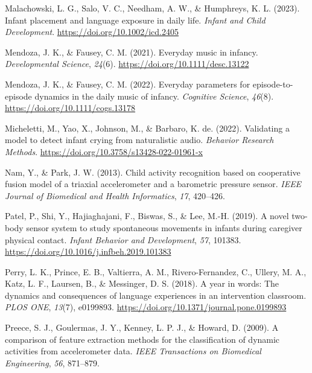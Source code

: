 \documentclass[
  man]{apa6}
\newlength{\cslhangindent}
\newlength{\cslentryspacingunit} %
\newenvironment{CSLReferences}[2] %
 {%
  \setlength{\parindent}{0pt}
  \ifodd #1
  \let\oldpar\par
  \def\par{\hangindent=\cslhangindent\oldpar}
  \fi
  \setlength{\parskip}{#2\cslentryspacingunit}
 }%
 {}
\begin{document}
\begin{CSLReferences}{1}{0}
\leavevmode{}%
Malachowski, L. G., Salo, V. C., Needham, A. W., \& Humphreys, K. L. (2023). Infant placement and language exposure in daily life. \emph{Infant and Child Development}. \url{https://doi.org/10.1002/icd.2405}

\leavevmode{}%
Mendoza, J. K., \& Fausey, C. M. (2021). Everyday music in infancy. \emph{Developmental Science}, \emph{24}(6). \url{https://doi.org/10.1111/desc.13122}

\leavevmode{}%
Mendoza, J. K., \& Fausey, C. M. (2022). Everyday parameters for episode-to-episode dynamics in the daily music of infancy. \emph{Cognitive Science}, \emph{46}(8). \url{https://doi.org/10.1111/cogs.13178}

\leavevmode{}%
Micheletti, M., Yao, X., Johnson, M., \& Barbaro, K. de. (2022). Validating a model to detect infant crying from naturalistic audio. \emph{Behavior Research Methods}. \url{https://doi.org/10.3758/s13428-022-01961-x}

\leavevmode{}%
Nam, Y., \& Park, J. W. (2013). Child activity recognition based on cooperative fusion model of a triaxial accelerometer and a barometric pressure sensor. \emph{IEEE Journal of Biomedical and Health Informatics}, \emph{17}, 420--426.

\leavevmode{}%
Patel, P., Shi, Y., Hajiaghajani, F., Biswas, S., \& Lee, M.-H. (2019). A novel two-body sensor system to study spontaneous movements in infants during caregiver physical contact. \emph{Infant Behavior and Development}, \emph{57}, 101383. \url{https://doi.org/10.1016/j.infbeh.2019.101383}

\leavevmode{}%
Perry, L. K., Prince, E. B., Valtierra, A. M., Rivero-Fernandez, C., Ullery, M. A., Katz, L. F., Laursen, B., \& Messinger, D. S. (2018). A year in words: The dynamics and consequences of language experiences in an intervention classroom. \emph{{PLOS} {ONE}}, \emph{13}(7), e0199893. \url{https://doi.org/10.1371/journal.pone.0199893}

\leavevmode{}%
Preece, S. J., Goulermas, J. Y., Kenney, L. P. J., \& Howard, D. (2009). A comparison of feature extraction methods for the classification of dynamic activities from accelerometer data. \emph{IEEE Transactions on Biomedical Engineering}, \emph{56}, 871--879.


\end{CSLReferences}
\end{document}
